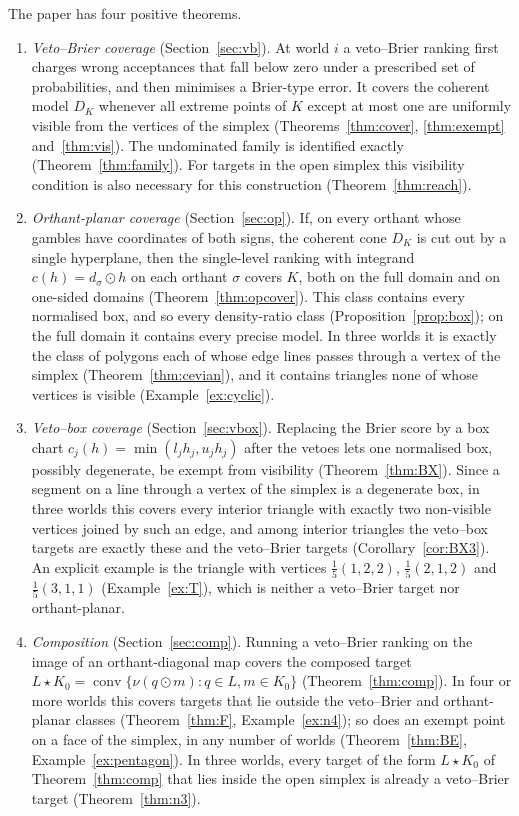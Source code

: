 \documentclass[11pt]{article}
\DeclareMathOperator{\conv}{conv}
\theoremstyle{plain}
\theoremstyle{definition}
\theoremstyle{remark}
\begin{document}
The paper has four positive theorems.
\begin{enumerate}[label=(\arabic*)]
  \item \emph{Veto--Brier coverage} (Section~\ref{sec:vb}). At world $i$ a veto--Brier
  ranking first charges wrong acceptances that fall below zero under a prescribed set of
  probabilities, and then minimises a Brier-type error. It covers the coherent model $D_K$
  whenever all extreme points of $K$ except at most one are uniformly visible from the
  vertices of the simplex (Theorems~\ref{thm:cover}, \ref{thm:exempt} and~\ref{thm:vis}).
  The undominated family is identified exactly (Theorem~\ref{thm:family}). For targets in
  the open simplex this visibility condition is also necessary for this construction
  (Theorem~\ref{thm:reach}).
  \item \emph{Orthant-planar coverage} (Section~\ref{sec:op}). If, on every orthant
  whose gambles have coordinates of both signs, the coherent cone $D_K$ is cut out by a single
  hyperplane, then the single-level ranking with integrand $c(h)=d_\sigma\odot h$ on each
  orthant $\sigma$ covers $K$, both on the full domain and on one-sided domains
  (Theorem~\ref{thm:opcover}). This class contains every normalised box, and so every
  density-ratio class (Proposition~\ref{prop:box}); on the full domain it contains every
  precise model. In three worlds it is exactly the class of polygons each of whose edge
  lines passes through a vertex of the simplex (Theorem~\ref{thm:cevian}), and it contains
  triangles none of whose vertices is visible (Example~\ref{ex:cyclic}).
  \item \emph{Veto--box coverage} (Section~\ref{sec:vbox}). Replacing the Brier score by a
  box chart $c_j(h)=\min(l_jh_j,u_jh_j)$ after the vetoes lets one normalised box,
  possibly degenerate, be exempt from visibility (Theorem~\ref{thm:BX}). Since a segment on
  a line through a vertex of the simplex is a degenerate box, in three worlds this covers
  every interior triangle with exactly two non-visible vertices joined by such an edge, and among
  interior triangles the veto--box targets are exactly these and the veto--Brier targets
  (Corollary~\ref{cor:BX3}). An explicit example is the triangle with vertices
  $\frac15(1,2,2)$, $\frac15(2,1,2)$ and $\frac15(3,1,1)$ (Example~\ref{ex:T}), which is
  neither a veto--Brier target nor orthant-planar.
  \item \emph{Composition} (Section~\ref{sec:comp}). Running a veto--Brier ranking on the
  image of an orthant-diagonal map covers the composed target $L\star K_0=\conv\{\nu(q\odot
  m):q\in L,m\in K_0\}$ (Theorem~\ref{thm:comp}). In four or more worlds this covers
  targets that lie outside the veto--Brier and orthant-planar classes
  (Theorem~\ref{thm:F}, Example~\ref{ex:n4}); so does an exempt point on a face of the
  simplex, in any number of worlds (Theorem~\ref{thm:BE}, Example~\ref{ex:pentagon}). In
  three worlds, every target of the form $L\star K_0$ of Theorem~\ref{thm:comp} that lies
  inside the open simplex is already a veto--Brier target (Theorem~\ref{thm:n3}).
\end{enumerate}
\end{document}
